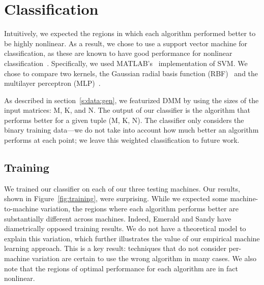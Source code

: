 \section{Classification}
\label{s:classification}

Intuitively, we expected the regions in which each algorithm performed better to be highly nonlinear.
As a result, we chose to use a support vector machine for classification, as these are known to have good performance for nonlinear classification~\cite{cortes1995support}.
Specifically, we used MATLAB's~\cite{MATLAB2011} implementation of SVM.
We chose to compare two kernels, the Gaussian radial basis function (RBF)~\cite{buhmann2003radial} and the multilayer perceptron (MLP)~\cite{collobert2004links}.

As described in section~\ref{s:data:gen}, we featurized DMM by using the sizes of the input matrices: M, K, and N.
The output of our classifier is the algorithm that performs better for a given tuple (M, K, N).
The classifier only considers the binary training data---we do not take into account how much better an algorithm performs at each point; we leave this weighted classification to future work.

\subsection{Training}
We trained our classifier on each of our three testing machines.
Our results, shown in Figure~\ref{fig:training}, were surprising.
While we expected some machine-to-machine variation, the regions where each algorithm performs better are substantially different across machines.
Indeed, Emerald and Sandy have diametrically opposed training results.
We do not have a theoretical model to explain this variation, which further illustrates the value of our empirical machine learning approach.
This is a key result: techniques that do not consider per-machine variation are certain to use the wrong algorithm in many cases.
We also note that the regions of optimal performance for each algorithm are in fact nonlinear.

